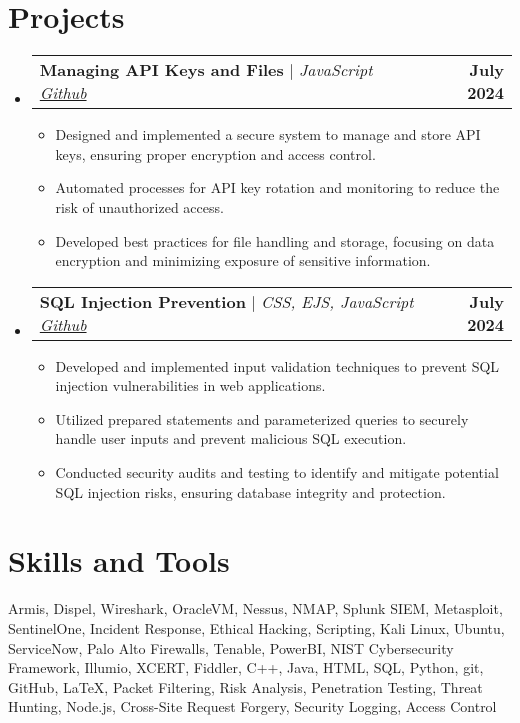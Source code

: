 \documentclass[letterpaper,11pt]{article}
\makeatletter
\newcommand{\resumeItem}[1]{
  \item\small{
    {#1 \vspace{-2pt}}
  }
}
\newcommand{\resumeProjectHeading}[2]{
    \item
    \begin{tabular*}{1.001\textwidth}{l@{\extracolsep{\fill}}r}
      \small#1 & \textbf{\small #2}\\
    \end{tabular*}\vspace{-7pt}
}
\newcommand{\resumeSubHeadingListStart}{\begin{itemize}[leftmargin=0.0in, label={}]}
\newcommand{\resumeSubHeadingListEnd}{\end{itemize}}
\newcommand{\resumeItemListStart}{\begin{itemize}}
\newcommand{\resumeItemListEnd}{\end{itemize}\vspace{-5pt}}
\makeatother
\begin{document}
\section{Projects}
    \vspace{-6pt}
    \resumeSubHeadingListStart
    \resumeProjectHeading
          {\textbf{Managing API Keys and Files} $|$ \emph{JavaScript \href{https://github.com/RaineJohnson/Node-Env-Keys-Management}{Github}}}{July 2024}
          \resumeItemListStart
            \resumeItem{Designed and implemented a secure system to manage and store API keys, ensuring proper encryption and access control.}
            \resumeItem{Automated processes for API key rotation and monitoring to reduce the risk of unauthorized access.}
            \resumeItem{Developed best practices for file handling and storage, focusing on data encryption and minimizing exposure of sensitive information.}
          \resumeItemListEnd
          \vspace{-14pt}

    \resumeProjectHeading
          {\textbf{SQL Injection Prevention} $|$ \emph{CSS, EJS, JavaScript \href{https://github.com/RaineJohnson/SQL-Injection-Project}{Github}}}{July 2024}
          \resumeItemListStart
            \resumeItem{Developed and implemented input validation techniques to prevent SQL injection vulnerabilities in web applications.}
            \resumeItem{Utilized prepared statements and parameterized queries to securely handle user inputs and prevent malicious SQL execution.}
            \resumeItem{Conducted security audits and testing to identify and mitigate potential SQL injection risks, ensuring database integrity and protection.}
          \resumeItemListEnd
          \vspace{-14pt}
    \resumeSubHeadingListEnd
\vspace{-3pt}

\section{Skills and Tools}
 \begin{itemize}[leftmargin=0.1in, label={}]
    \small{\item{
     {Armis, Dispel, Wireshark, OracleVM, Nessus, NMAP, Splunk SIEM, Metasploit, SentinelOne, Incident Response, Ethical Hacking, Scripting, Kali Linux, Ubuntu, ServiceNow, Palo Alto Firewalls, Tenable, PowerBI, NIST Cybersecurity Framework, Illumio, XCERT, Fiddler, C++, Java, HTML, SQL, Python, git, GitHub, LaTeX, Packet Filtering, Risk Analysis, Penetration Testing, Threat Hunting, Node.js, Cross-Site Request Forgery, Security Logging, Access Control} \\
     
    }}
 \end{itemize}
 \vspace{-20pt}
\end{document}
